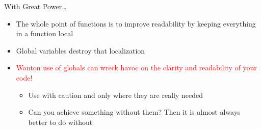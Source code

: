 \documentclass[pdf, aspectratio=169, 12pt]{beamer}
\begin{document}

\begin{frame}{With Great Power\ldots}
	\begin{itemize}
		\item The whole point of functions is to improve readability by keeping everything in a function local
		\item Global variables destroy that localization
		\item \textcolor{Red}{Wanton use of globals can wreck havoc on the clarity and readability of your code!}
			\begin{itemize}
				\item Use with caution and only where they are really needed
				\item Can you achieve something without them? Then it is almost always better to do without
			\end{itemize}
			
	\end{itemize}
	
\end{frame}
\end{document}
